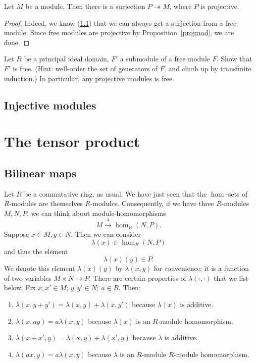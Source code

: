 \begin{corollary} 
Let $M$ be a module. Then there is a surjection $P \twoheadrightarrow M$,
where $P$ is projective.
\end{corollary} 
\begin{proof} 
Indeed, we know (\ref{}) that we can always get a surjection from a free
module. Since free modules are projective by Proposition~\ref{projmod}, we are
done.
\end{proof} 

\begin{exercise} 
Let $R$ be a principal ideal domain, $F'$ a submodule of a free module $F$. Show that
$F'$ is free. (Hint: well-order the set of generators of $F$, and climb up by
transfinite induction.) 
In particular, any projective modules is free.
\end{exercise} 

\subsection{Injective modules}

\section{The tensor product}

\subsection{Bilinear maps}
Let $R$ be a commutative ring, as usual.
We have just seen that the $\hom$-sets of $R$-modules are themselves
$R$-modules. 
Consequently, if we have three $R$-modules $M,N,P$, we can think about module-homomorphisms
\[ M \stackrel{\lambda}{\to}\hom_R(N,P).  \]
Suppose $x \in M, y \in N$.  Then we can consider
\[ \lambda(x) \in \hom_R(N,P)  \]
and thus the element
\[ \lambda(x)(y) \in P.  \]
We denote this element $\lambda(x)(y)$ by $\lambda(x,y)$ for convenience; it
is a function of two variables $M \times N \to P$. There are
certain properties of $\lambda(\cdot, \cdot)$ that we list below.
Fix $x , x' \in M$; $y, y' \in N; \ a \in R$. Then:
\begin{enumerate}
\item  $\lambda(x,y+y') = \lambda(x,y) + \lambda(x, y')$ because $\lambda(x)$ is
 additive. 
\item  $\lambda(x, ay) = a \lambda(x,y)$ because $\lambda(x)$ is an
$R$-module homomorphism.
\item  $\lambda(x+x', y) = \lambda(x,y) + \lambda(x', y)$ because
$\lambda$ is additive.
\item   $\lambda(ax, y) = a\lambda(x,y)$ because $\lambda$ is an $R$-module
$R$-module homomorphism.
\end{enumerate}

